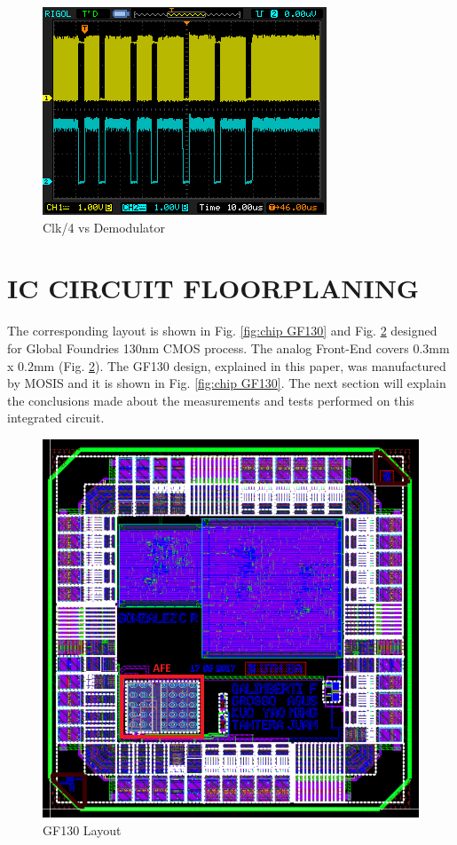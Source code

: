 \documentclass{article} %
\begin{document}
\begin{multicols}{2}
\begin{figure}[H]
    \centering
    \includegraphics[scale=0.65]{Images/ImagenesTesina/mediciones/demod2.png}
    \caption{Clk/4 vs Demodulator}
    \label{fig:demod_medicion}
\end{figure}


\section{IC CIRCUIT FLOORPLANING}

The corresponding layout is shown in Fig. \ref{fig:chip GF130} and Fig. \ref{fig:layout GF130}
designed for Global Foundries 130nm CMOS process. The
analog Front-End covers 0.3mm x 0.2mm (Fig. \ref{fig:layout GF130}).
The GF130 design, explained in this paper, was
manufactured by MOSIS \cite{mosis} and it is shown in Fig. \ref{fig:chip GF130}. The
next section will explain the conclusions made about the measurements and tests performed on this integrated circuit.


\begin{figure}[H]
    \centering
    \includegraphics[width=0.5\linewidth]{Images/ImagenesTesina/circuitos/gf130_layout.png}
    \caption{GF130 Layout}
    \label{fig:layout GF130}
\end{figure}


\end{multicols}
\end{document}
